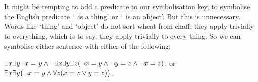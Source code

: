 It might be tempting to add a predicate to our symbolisation key, to symbolise the English predicate `\blank\ is a thing' or `\blank\ is an object'. But this is unnecessary. Words like `thing' and `object' do not sort wheat from chaff: they apply trivially to everything, which is to say, they apply trivially to every thing. So we can symbolise either sentence with either of the following:
	\begin{center}
		$\exists x \exists y \neg x = y \wedge \neg \exists x \exists y \exists z (\neg x = y \wedge \neg y = z \wedge \neg x = z)$; or\\
		$\exists x \exists y \bigl(\neg x = y \wedge \forall z(x=z \vee y = z) \bigr)$.
	\end{center}


\practiceproblems

